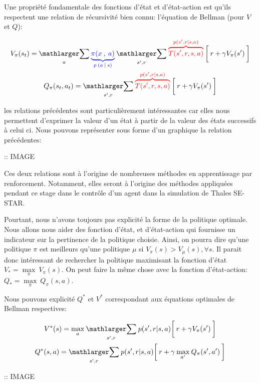 Une propriété fondamentale des fonctions d'état et d'état-action est qu'ils respectent une relation de récursivité bien connu: l'équation de Bellman (pour $V$ et $Q$):

\begin{gather}
V_\pi(s_t) = \underset{a}{\bsum}\: \policyc{blue} \:\underset{s', r}{\bsum}\:\dynamicsc{red}\: \bigg[\: r + \gamma V_\pi(s') \:\bigg] \\
Q_\pi(s_t, a_t) = \underset{s', r}{\bsum}\:\dynamicsc{red}\: \bigg[\: r + \gamma V_\pi(s') \:\bigg] 
\end{gather}

\bigskip

les relations précédentes sont particulièrement intéressantes car elles nous permettent d'exprimer la valeur d'un état à partir de la valeur des états successifs à celui ci. Nous pouvons représenter sous forme d'un graphique la relation précédentes:

:: IMAGE

Ces deux relations sont à l'origine de nombreuses méthodes en apprentissage par renforcement. Notamment, elles seront à l'origine des méthodes appliquées pendant ce stage dans le contrôle d'un agent dans la simulation de Thales SE-STAR.

Pourtant, nous n'avons toujours pas explicité la forme de la politique optimale. Nous allons nous aider des fonction d'état, et d'état-action qui fournisse un indicateur sur la pertinence de la politique choisie. Ainsi, on pourra dire qu'une politique $\pi$ est meilleurs qu'une politique $\mu$ si $V_\pi(s) > V_\mu(s), \forall s $. Il parait donc intéressant de rechercher la politique maximisant la fonction d'état $ V_* = \underset{\pi}{\max} \:V_\pi(s) $. On peut faire la même chose avec la fonction d'état-action: $ Q_* = \underset{\pi}{\max} \:Q_\pi(s, a) $.

Nous pouvons explicité $Q^*$ et $V^*$ correspondant aux équations optimales de Bellman respectives:

\begin{gather}
V^*(s) = \underset{a}{\max} \: \underset{s', r}{\bsum} \: p(s',r \vert s, a) \bigg[\: r + \gamma V_\pi(s') \:\bigg]
\\
Q^*(s, a) = \underset{s', r}{\bsum} \: p(s',r \vert s, a) \bigg[\: r + \gamma \: \underset{a'}{\max} \: Q_\pi(s', a') \:\bigg]
\end{gather}
\bigskip

:: IMAGE

